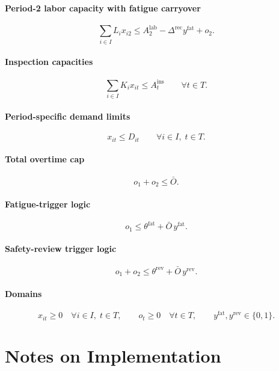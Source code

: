 \paragraph{Period-2 labor capacity with fatigue carryover}
\[
\sum_{i\in I} L_i x_{i2} \le A^{\text{lab}}_2 - \Delta^{\text{rec}} y^{\text{fat}} + o_2.
\]

\paragraph{Inspection capacities}
\[
\sum_{i\in I} K_i x_{it} \le A^{\text{ins}}_t
\qquad \forall t\in T.
\]

\paragraph{Period-specific demand limits}
\[
x_{it} \le D_{it}
\qquad \forall i\in I,\; t\in T.
\]

\paragraph{Total overtime cap}
\[
o_1 + o_2 \le \bar O.
\]

\paragraph{Fatigue-trigger logic}
\[
o_1 \le \theta^{\text{fat}} + \bar O\, y^{\text{fat}}.
\]

\paragraph{Safety-review trigger logic}
\[
o_1 + o_2 \le \theta^{\text{rev}} + \bar O\, y^{\text{rev}}.
\]

\paragraph{Domains}
\[
x_{it}\ge 0 \quad \forall i\in I,\; t\in T,
\qquad
o_t\ge 0 \quad \forall t\in T,
\qquad
y^{\text{fat}},y^{\text{rev}}\in\{0,1\}.
\]

\section*{Notes on Implementation}

